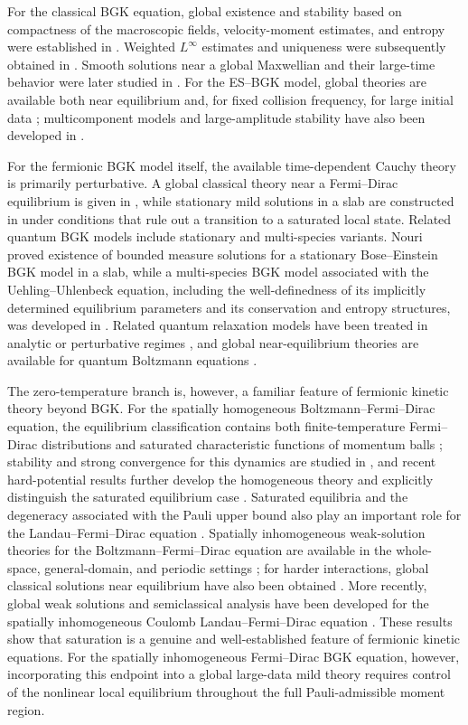 \documentclass[10pt,reqno]{amsart}
\numberwithin{equation}{section}
\theoremstyle{definition}
\begin{document}
For the classical BGK equation, global existence and stability based on compactness of the macroscopic fields, velocity-moment estimates, and entropy were established in \cite{Per89}. Weighted $L^\infty$ estimates and uniqueness were subsequently obtained in \cite{PP93}. Smooth solutions near a global Maxwellian and their large-time behavior were later studied in \cite{Yun10}. For the ES--BGK model, global theories are available both near equilibrium and, for fixed collision frequency, for large initial data \cite{HY19,Yun15JDE,Yun15SIAM}; multicomponent models and large-amplitude stability have also been developed in \cite{BKPY23,BKLY26}.

For the fermionic BGK model itself, the available time-dependent Cauchy theory is primarily perturbative. A global classical theory near a Fermi--Dirac equilibrium is given in \cite{BY20}, while stationary mild solutions in a slab are constructed in \cite{BY20S} under conditions that rule out a transition to a saturated local state. Related quantum BGK models include stationary and multi-species variants. Nouri \cite{Nou08} proved existence of bounded measure solutions for a stationary Bose--Einstein BGK model in a slab, while a multi-species BGK model associated with the Uehling--Uhlenbeck equation, including the well-definedness of its implicitly determined equilibrium parameters and its conservation and entropy structures, was developed in \cite{BKPY21}. Related quantum relaxation models have been treated in analytic or perturbative regimes \cite{Bra19,Bra20}, and global near-equilibrium theories are available for quantum Boltzmann equations \cite{BJY21,OW22}.

The zero-temperature branch is, however, a familiar feature of fermionic kinetic theory beyond BGK.  For the spatially homogeneous Boltzmann--Fermi--Dirac equation, the equilibrium classification contains both finite-temperature Fermi--Dirac distributions and saturated characteristic functions of momentum balls \cite{Lu01}; stability and strong convergence for this dynamics are studied in \cite{LW03}, and recent hard-potential results further develop the homogeneous theory and explicitly distinguish the saturated equilibrium case \cite{AP25p}.  Saturated equilibria and the degeneracy associated with the Pauli upper bound also play an important role for the Landau--Fermi--Dirac equation \cite{ABDL22,BL04,GGZ22}.  Spatially inhomogeneous weak-solution theories for the Boltzmann--Fermi--Dirac equation are available in the whole-space, general-domain, and periodic settings \cite{All10,Dol94,Lu08}; for harder interactions, global classical solutions near equilibrium have also been obtained \cite{JZ25}. More recently, global weak solutions and semiclassical analysis have been developed for the spatially inhomogeneous Coulomb Landau--Fermi--Dirac equation \cite{Sam24p,Sam26}.  These results show that saturation is a genuine and well-established feature of fermionic kinetic equations.  For the spatially inhomogeneous Fermi--Dirac BGK equation, however, incorporating this endpoint into a global large-data mild theory requires control of the nonlinear local equilibrium throughout the full Pauli-admissible moment region.
\end{document}

